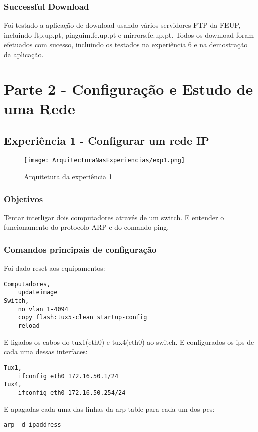 \documentclass[a4paper]{article}
\begin{document}
\subsubsection{Successful Download}
Foi testado a aplicação de download usando vários servidores FTP da FEUP, incluindo ftp.up.pt, pinguim.fe.up.pt e mirrors.fe.up.pt. Todos os download foram efetuados com sucesso, incluindo os testados na experiência 6 e na demostração da aplicação.

\section{Parte 2 - Configuração e Estudo de uma Rede}

\subsection{Experiência 1 - Configurar um rede IP}

\begin{figure}[h]
    \centering
    \texttt{[image: ArquitecturaNasExperiencias/exp1.png]}
    \caption{Arquitetura da experiência 1}
\end{figure}

\subsubsection{Objetivos}
Tentar interligar dois computadores através de um switch. E entender o funcionamento do protocolo ARP e do comando ping.

\subsubsection{Comandos principais de configuração}
Foi dado reset aos equipamentos:
\begin{verbatim}
Computadores,
    updateimage
Switch,
    no vlan 1-4094
    copy flash:tux5-clean startup-config
    reload
\end{verbatim}

E ligados os cabos do tux1(eth0) e tux4(eth0) ao switch. E configurados os ips de cada uma dessas interfaces:
\begin{verbatim}
Tux1,
    ifconfig eth0 172.16.50.1/24
Tux4,
    ifconfig eth0 172.16.50.254/24
\end{verbatim}

E apagadas cada uma das linhas da arp table para cada um dos pcs:
\begin{verbatim}
arp -d ipaddress
\end{verbatim}
\end{document}
